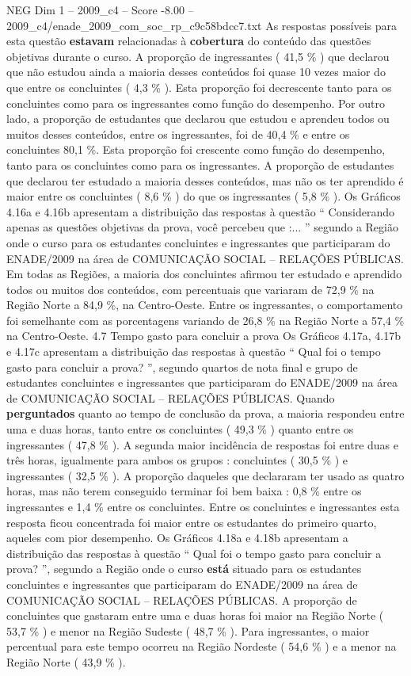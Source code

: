 \begin{textsample}{NEG Dim 1 – 2009\_c4 – Score -8.00 – 2009\_c4/enade\_2009\_com\_soc\_rp\_c9c58bdcc7.txt}
As respostas possíveis para esta questão \textbf{estavam} relacionadas à \textbf{cobertura} do conteúdo das questões objetivas durante o curso.
A proporção de ingressantes ( 41,5 \% ) que declarou que não estudou ainda a maioria desses conteúdos foi quase 10 vezes maior do que entre os concluintes ( 4,3 \% ).
Esta proporção foi decrescente tanto para os concluintes como para os ingressantes como função do desempenho.
Por outro lado, a proporção de estudantes que declarou que estudou e aprendeu todos ou muitos desses conteúdos, entre os ingressantes, foi de 40,4 \% e entre os concluintes 80,1 \%.
Esta proporção foi crescente como função do desempenho, tanto para os concluintes como para os ingressantes.
A proporção de estudantes que declarou ter estudado a maioria desses conteúdos, mas não os ter aprendido é maior entre os concluintes ( 8,6 \% ) do que os ingressantes ( 5,8 \% ).
Os Gráficos 4.16a e 4.16b apresentam a distribuição das respostas à questão “ Considerando apenas as questões objetivas da prova, você percebeu que :... ” segundo a Região onde o curso para os estudantes concluintes e ingressantes que participaram do ENADE/2009 na área de COMUNICAÇÃO SOCIAL – RELAÇÕES PÚBLICAS.
Em todas as Regiões, a maioria dos concluintes afirmou ter estudado e aprendido todos ou muitos dos conteúdos, com percentuais que variaram de 72,9 \% na Região Norte a 84,9 \%, na Centro-Oeste.
Entre os ingressantes, o comportamento foi semelhante com as porcentagens variando de 26,8 \% na Região Norte a 57,4 \% na Centro-Oeste. 4.7 Tempo gasto para concluir a prova Os Gráficos 4.17a, 4.17b e 4.17c apresentam a distribuição das respostas à questão “ Qual foi o tempo gasto para concluir a prova? ”, segundo quartos de nota final e grupo de estudantes concluintes e ingressantes que participaram do ENADE/2009 na área de COMUNICAÇÃO SOCIAL – RELAÇÕES PÚBLICAS.
Quando \textbf{perguntados} quanto ao tempo de conclusão da prova, a maioria respondeu entre uma e duas horas, tanto entre os concluintes ( 49,3 \% ) quanto entre os ingressantes ( 47,8 \% ).
A segunda maior incidência de respostas foi entre duas e três horas, igualmente para ambos os grupos : concluintes ( 30,5 \% ) e ingressantes ( 32,5 \% ).
A proporção daqueles que declararam ter usado as quatro horas, mas não terem conseguido terminar foi bem baixa : 0,8 \% entre os ingressantes e 1,4 \% entre os concluintes.
Entre os concluintes e ingressantes esta resposta ficou concentrada foi maior entre os estudantes do primeiro quarto, aqueles com pior desempenho.
Os Gráficos 4.18a e 4.18b apresentam a distribuição das respostas à questão “ Qual foi o tempo gasto para concluir a prova? ”, segundo a Região onde o curso \textbf{está} situado para os estudantes concluintes e ingressantes que participaram do ENADE/2009 na área de COMUNICAÇÃO SOCIAL – RELAÇÕES PÚBLICAS.
A proporção de concluintes que gastaram entre uma e duas horas foi maior na Região Norte ( 53,7 \% ) e menor na Região Sudeste ( 48,7 \% ).
Para ingressantes, o maior percentual para este tempo ocorreu na Região Nordeste ( 54,6 \% ) e a menor na Região Norte ( 43,9 \% ).

\end{textsample}
